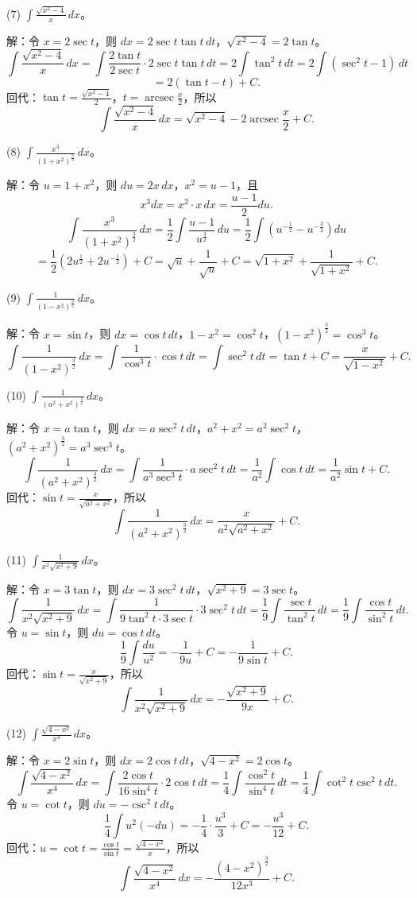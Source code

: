 (7) \(\int\frac{\sqrt{x^{2}-4}}{x}\,dx\)。

解：令 \(x=2\sec t\)，则 \(dx=2\sec t\tan t\,dt\)，\(\sqrt{x^{2}-4}=2\tan t\)。
\[ \int\frac{\sqrt{x^{2}-4}}{x}\,dx=\int\frac{2\tan t}{2\sec t}\cdot 2\sec t\tan t\,dt=2\int\tan^{2}t\,dt=2\int(\sec^{2}t-1)\,dt \]
\[ =2(\tan t-t)+C. \]
回代：\(\tan t=\frac{\sqrt{x^{2}-4}}{2}\)，\(t=\operatorname{arcsec}\frac{x}{2}\)，所以
\[ \int\frac{\sqrt{x^{2}-4}}{x}\,dx=\sqrt{x^{2}-4}-2\operatorname{arcsec}\frac{x}{2}+C. \]

(8) \(\int\frac{x^{3}}{(1+x^{2})^{\frac{3}{2}}}\,dx\)。

解：令 \(u=1+x^{2}\)，则 \(du=2x\,dx\)，\(x^{2}=u-1\)，且
\[ x^{3}dx=x^{2}\cdot x\,dx=\frac{u-1}{2}du. \]
\[ \int\frac{x^{3}}{(1+x^{2})^{\frac{3}{2}}}\,dx=\frac{1}{2}\int\frac{u-1}{u^{\frac{3}{2}}}\,du=\frac{1}{2}\int\left(u^{-\frac{1}{2}}-u^{-\frac{3}{2}}\right)du \]
\[ =\frac{1}{2}\left(2u^{\frac{1}{2}}+2u^{-\frac{1}{2}}\right)+C=\sqrt{u}+\frac{1}{\sqrt{u}}+C=\sqrt{1+x^{2}}+\frac{1}{\sqrt{1+x^{2}}}+C. \]

(9) \(\int\frac{1}{(1-x^{2})^{\frac{3}{2}}}\,dx\)。

解：令 \(x=\sin t\)，则 \(dx=\cos t\,dt\)，\(1-x^{2}=\cos^{2}t\)，\((1-x^{2})^{\frac{3}{2}}=\cos^{3}t\)。
\[ \int\frac{1}{(1-x^{2})^{\frac{3}{2}}}\,dx=\int\frac{1}{\cos^{3}t}\cdot\cos t\,dt=\int\sec^{2}t\,dt=\tan t+C=\frac{x}{\sqrt{1-x^{2}}}+C. \]

(10) \(\int\frac{1}{(a^{2}+x^{2})^{\frac{3}{2}}}\,dx\)。

解：令 \(x=a\tan t\)，则 \(dx=a\sec^{2}t\,dt\)，\(a^{2}+x^{2}=a^{2}\sec^{2}t\)，\((a^{2}+x^{2})^{\frac{3}{2}}=a^{3}\sec^{3}t\)。
\[ \int\frac{1}{(a^{2}+x^{2})^{\frac{3}{2}}}\,dx=\int\frac{1}{a^{3}\sec^{3}t}\cdot a\sec^{2}t\,dt=\frac{1}{a^{2}}\int\cos t\,dt=\frac{1}{a^{2}}\sin t+C. \]
回代：\(\sin t=\frac{x}{\sqrt{a^{2}+x^{2}}}\)，所以
\[ \int\frac{1}{(a^{2}+x^{2})^{\frac{3}{2}}}\,dx=\frac{x}{a^{2}\sqrt{a^{2}+x^{2}}}+C. \]

(11) \(\int\frac{1}{x^{2}\sqrt{x^{2}+9}}\,dx\)。

解：令 \(x=3\tan t\)，则 \(dx=3\sec^{2}t\,dt\)，\(\sqrt{x^{2}+9}=3\sec t\)。
\[ \int\frac{1}{x^{2}\sqrt{x^{2}+9}}\,dx=\int\frac{1}{9\tan^{2}t\cdot 3\sec t}\cdot 3\sec^{2}t\,dt=\frac{1}{9}\int\frac{\sec t}{\tan^{2}t}\,dt=\frac{1}{9}\int\frac{\cos t}{\sin^{2}t}\,dt. \]
令 \(u=\sin t\)，则 \(du=\cos t\,dt\)。
\[ \frac{1}{9}\int\frac{du}{u^{2}}=-\frac{1}{9u}+C=-\frac{1}{9\sin t}+C. \]
回代：\(\sin t=\frac{x}{\sqrt{x^{2}+9}}\)，所以
\[ \int\frac{1}{x^{2}\sqrt{x^{2}+9}}\,dx=-\frac{\sqrt{x^{2}+9}}{9x}+C. \]

(12) \(\int\frac{\sqrt{4-x^{2}}}{x^{4}}\,dx\)。

解：令 \(x=2\sin t\)，则 \(dx=2\cos t\,dt\)，\(\sqrt{4-x^{2}}=2\cos t\)。
\[ \int\frac{\sqrt{4-x^{2}}}{x^{4}}\,dx=\int\frac{2\cos t}{16\sin^{4}t}\cdot 2\cos t\,dt=\frac{1}{4}\int\frac{\cos^{2}t}{\sin^{4}t}\,dt=\frac{1}{4}\int\cot^{2}t\csc^{2}t\,dt. \]
令 \(u=\cot t\)，则 \(du=-\csc^{2}t\,dt\)。
\[ \frac{1}{4}\int u^{2}(-du)=-\frac{1}{4}\cdot\frac{u^{3}}{3}+C=-\frac{u^{3}}{12}+C. \]
回代：\(u=\cot t=\frac{\cos t}{\sin t}=\frac{\sqrt{4-x^{2}}}{x}\)，所以
\[ \int\frac{\sqrt{4-x^{2}}}{x^{4}}\,dx=-\frac{(4-x^{2})^{\frac{3}{2}}}{12x^{3}}+C. \]
